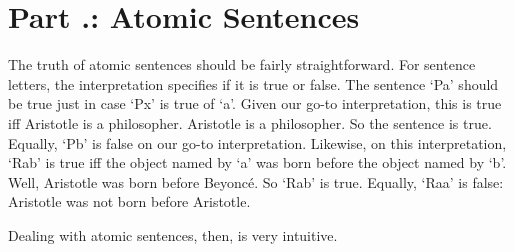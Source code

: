 \section{Part \thechapcount.\theseccount: Atomic Sentences}
The truth of atomic sentences should be fairly straightforward. For sentence letters, the interpretation specifies if it is true or false. The sentence ‘Pa’ should be true just in case ‘Px’ is true of ‘a’. Given our go-to interpretation, this is true iff Aristotle is a philosopher. Aristotle is a philosopher. So the sentence is true. Equally, ‘Pb’ is false on our go-to interpretation. Likewise, on this interpretation, ‘Rab’ is true iff the object named by ‘a’ was born before the object named by ‘b’. Well, Aristotle was born before Beyoncé. So ‘Rab’ is true. Equally, ‘Raa’ is false: Aristotle was not born before Aristotle.

Dealing with atomic sentences, then, is very intuitive. 
